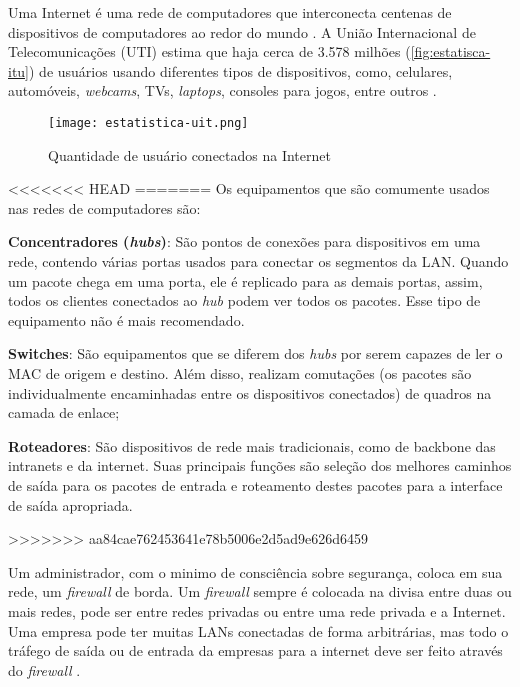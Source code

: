 Uma Internet é uma rede de computadores que interconecta centenas de dispositivos de computadores ao redor do mundo \cite{redes:kurose}. A União Internacional de Telecomunicações (UTI) estima que haja cerca de 3.578 milhões (\autoref{fig:estatisca-itu}) de usuários usando diferentes tipos de dispositivos, como, celulares, automóveis, \textit{webcams}, TVs, \textit{laptops}, consoles para jogos, entre outros \cite{estatistica:itu}.

\begin{figure}[htb]
    \centering
    \caption{Quantidade de usuário conectados na Internet} 
    \texttt{[image: estatistica-uit.png]}
    \label{fig:estatisca-itu}
\end{figure}

<<<<<<< HEAD
\cite{redes:kurose}
=======
Os equipamentos que são comumente usados nas redes de computadores são:

\begin{alineas}
\item \textbf{Concentradores (\textit{hubs})}: São pontos de conexões para dispositivos em uma rede, contendo várias portas usados para conectar os segmentos da LAN. Quando um pacote chega em uma porta, ele é replicado para as demais portas, assim, todos os clientes conectados ao \textit{hub} podem ver todos os pacotes. Esse tipo de equipamento não é mais recomendado.
\item \textbf{Switches}: São equipamentos que se diferem dos \textit{hubs} por serem capazes de ler o MAC de origem e destino. Além disso, realizam comutações (os pacotes são individualmente encaminhadas entre os dispositivos conectados) de quadros na camada de enlace;
\item \textbf{Roteadores}: São dispositivos de rede mais tradicionais, como de backbone das intranets e da internet. Suas principais funções são seleção dos melhores caminhos de saída para os pacotes de entrada e roteamento destes pacotes para a interface de saída apropriada.
\end{alineas}
>>>>>>> aa84cae762453641e78b5006e2d5ad9e626d6459

Um administrador, com o minimo de consciência sobre segurança, coloca em sua rede, um \textit{firewall} de borda. Um \textit{firewall} sempre é colocada na divisa entre duas ou mais redes, pode ser entre redes privadas ou entre uma rede privada e a Internet. Uma empresa pode ter muitas LANs conectadas de forma arbitrárias, mas todo o tráfego de saída ou de entrada da empresas para a internet deve ser feito através do \textit{firewall} \cite{redesdecomputadores}.

